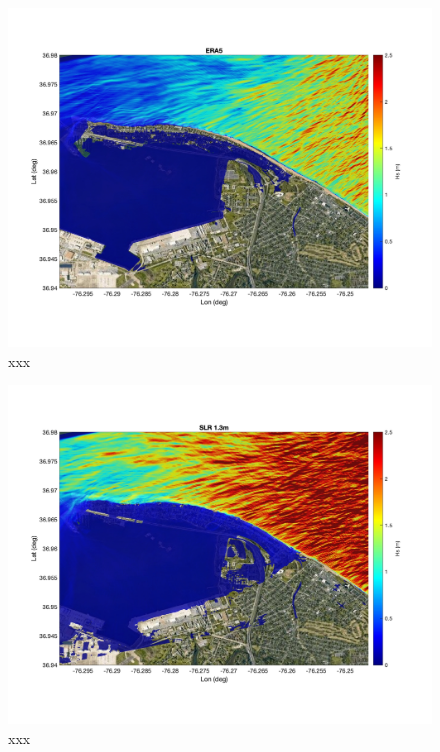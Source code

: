 \documentclass[preprint,12pt,authoryear]{elsarticle}
\begin{document}
\begin{figure}
\centering
\includegraphics[width=\textwidth]{./figures/funwave_ERA5_hs.jpg}
\caption{xxx }
\label{boundary}
\centering
\end{figure}

\begin{figure}
\centering
\includegraphics[width=\textwidth]{./figures/funwave_SLR_hs.jpg}
\caption{xxx }
\label{boundary}
\centering
\end{figure}
\end{document}
